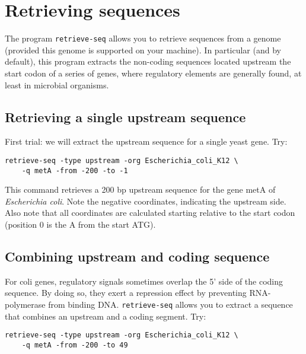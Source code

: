 \chapter{Retrieving sequences}

The program \texttt{retrieve-seq} allows you to retrieve sequences
from a genome (provided this genome is supported on your machine). In
particular (and by default), this program extracts the non-coding
sequences located upstream the start codon of a series of genes, where
regulatory elements are generally found, at least in microbial
organisms.

\section{Retrieving a single upstream sequence}
First trial: we will extract the upstream sequence for a single yeast
gene. Try:

{\color{blue} \begin{footnotesize} 
\begin{verbatim}
retrieve-seq -type upstream -org Escherichia_coli_K12 \
    -q metA -from -200 -to -1
\end{verbatim}\end{footnotesize}}

This command retrieves a 200 bp upstream sequence for the gene metA of
\textit{Escherichia coli}. Note the negative coordinates, indicating the
upstream side. Also note that all coordinates are calculated starting
relative to the start codon (position 0 is the A from the start ATG).

\section{Combining upstream and coding sequence}
For coli genes, regulatory signals sometimes overlap the 5' side of
the coding sequence. By doing so, they exert a repression effect by
preventing RNA-polymerase from binding DNA. \texttt{retrieve-seq}
allows you to extract a sequence that combines an upstream and a
coding segment. Try:

{\color{blue} \begin{footnotesize}
\begin{verbatim}
retrieve-seq -type upstream -org Escherichia_coli_K12 \
    -q metA -from -200 -to 49
\end{verbatim}\end{footnotesize}}

